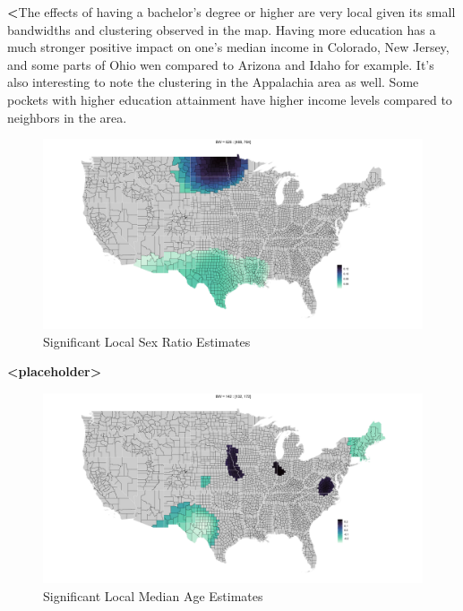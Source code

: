 \documentclass[
]{article}
\begin{document}
\textbf{\textless{}}The effects of having a bachelor's degree or higher
are very local given its small bandwidths and clustering observed in the
map. Having more education has a much stronger positive impact on one's
median income in Colorado, New Jersey, and some parts of Ohio wen
compared to Arizona and Idaho for example. It's also interesting to note
the clustering in the Appalachia area as well. Some pockets with higher
education attainment have higher income levels compared to neighbors in
the area.

\begin{figure}[H]

{\centering \includegraphics[width=1\linewidth]{images/local-param/sig-sex-ratio} 

}

\caption{Significant Local Sex Ratio Estimates}\label{fig:unnamed-chunk-17}
\end{figure}

\textbf{\textless placeholder\textgreater{}}

\begin{figure}[H]

{\centering \includegraphics[width=1\linewidth]{images/local-param/sig-median-age} 

}

\caption{Significant Local Median Age Estimates}\label{fig:unnamed-chunk-18}
\end{figure}
\end{document}
